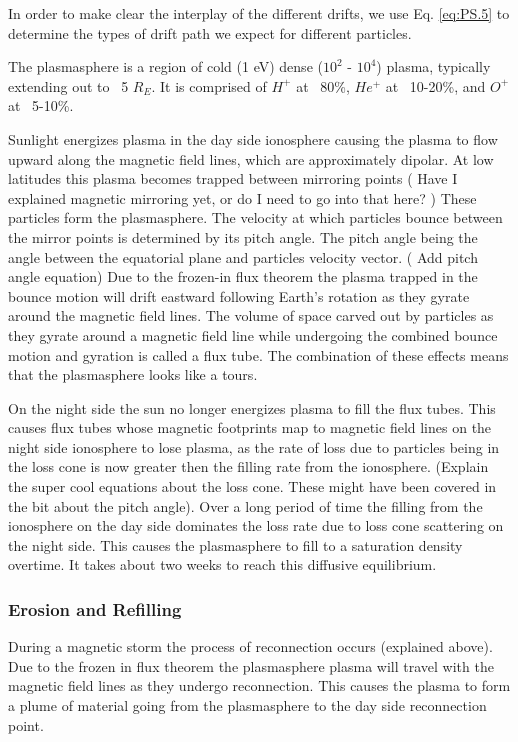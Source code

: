 \documentclass[utf8]{report}
\begin{document}
In order to make clear the interplay of the different drifts, we use Eq. \ref{eq:PS.5} to determine the types of drift path we expect for different particles. 

The plasmasphere is a region of cold (1 eV) dense ($10^{2}$ - $10^{4}$) plasma, typically extending out to ~5 $R_{E}$. It is comprised of $H^{+}$ at ~80\%, $He^{+}$ at ~10-20\%, and $O^{+}$ at ~5-10\%. \

Sunlight energizes plasma in the day side ionosphere causing the plasma to flow upward along the magnetic field lines, which are approximately dipolar. At low latitudes this plasma becomes trapped between mirroring points (\color{red} Have I explained magnetic mirroring yet, or do I need to go into that here? \color{black}) These particles form the plasmasphere. The velocity at which particles bounce between the mirror points is determined by its pitch angle. The pitch angle being the angle between the equatorial plane and particles velocity vector. (\color{red} Add pitch angle equation\color{black}) Due to the frozen-in flux theorem the plasma trapped in the bounce motion will drift eastward following Earth's rotation as they gyrate around the magnetic field lines. The volume of space carved out by particles as they gyrate around a magnetic field line while undergoing the combined bounce motion and gyration is called a flux tube. The combination of these effects means that the plasmasphere looks like a tours. 
 
 On the night side the sun no longer energizes plasma to fill the flux tubes. This causes flux tubes whose magnetic footprints map to magnetic field lines on the night side ionosphere to lose plasma, as the rate of loss due to particles being in the loss cone is now greater then the filling rate from the ionosphere. (\color{red}Explain the super cool equations about the loss cone. These might have been covered in the bit about the pitch angle\color{black}). Over a long period of time the filling from the ionosphere on the day side dominates the loss rate due to loss cone scattering on the night side. This causes the plasmasphere to fill to a saturation density overtime. It takes about two weeks to reach this diffusive equilibrium. 
 
 \subsubsection{Erosion and Refilling}
 
 During a magnetic storm the process of reconnection occurs (explained above). Due to the frozen in flux theorem the plasmasphere plasma will travel with the magnetic field lines as they undergo reconnection. This causes the plasma to form a plume of material going from the plasmasphere to the day side reconnection point. 
 
\end{document}
